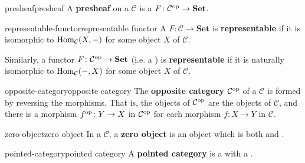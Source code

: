 \begin{topic}{presheaf}{presheaf}
    A \textbf{presheaf} on a  $\mathcal{C}$ is a  $F \colon \mathcal{C}^\textup{op} \to \textbf{Set}$.
\end{topic}

\begin{topic}{representable-functor}{representable functor}
    A  $F \colon \mathcal{C} \to \textbf{Set}$ is \textbf{representable} if it is  isomorphic to $\operatorname{Hom}_\mathcal{C}(X, -)$ for some object $X$ of $\mathcal{C}$.
    
    Similarly, a functor $F \colon \mathcal{C}^\textup{op} \to \textbf{Set}$ (i.e. a ) is \textbf{representable} if it is naturally isomorphic to $\operatorname{Hom}_\mathcal{C}(-, X)$ for some object $X$ of $\mathcal{C}$.
\end{topic}

\begin{topic}{opposite-category}{opposite category}
    The \textbf{opposite category} $\mathcal{C}^\textup{op}$ of a  $\mathcal{C}$ is formed by reversing the morphisms. That is, the objects of $\mathcal{C}^\textup{op}$ are the objects of $\mathcal{C}$, and there is a morphism $f^\textup{op} \colon Y \to X$ in $\mathcal{C}^\textup{op}$ for each morphism $f \colon X \to Y$ in $\mathcal{C}$.
\end{topic}

\begin{topic}{zero-object}{zero object}
    In a  $\mathcal{C}$, a \textbf{zero object} is an object which is both  and .
\end{topic}

\begin{topic}{pointed-category}{pointed category}
    A \textbf{pointed category} is a  with a .
\end{topic}


